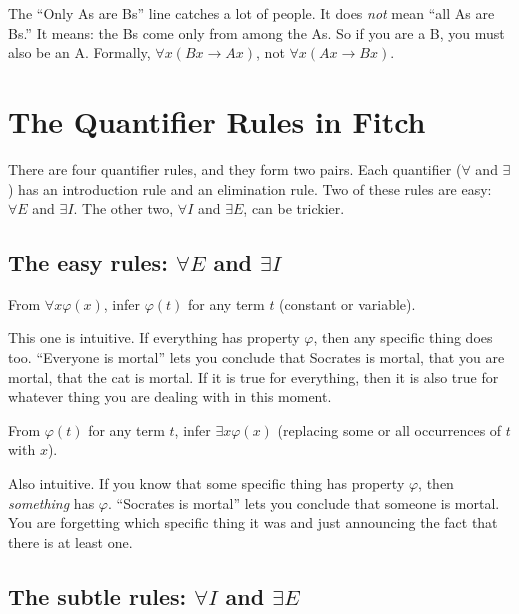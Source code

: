 \documentclass[11pt]{article}
\begin{document}
The ``Only As are Bs'' line catches a lot of people. It does \emph{not} mean ``all As are Bs.'' It means: the Bs come only from among the As. So if you are a B, you must also be an A. Formally, $\forall x(Bx \to Ax)$, not $\forall x(Ax \to Bx)$.

\section{The Quantifier Rules in Fitch}

There are four quantifier rules, and they form two pairs. Each quantifier ($\forall$ and $\exists$) has an introduction rule and an elimination rule. Two of these rules are easy: $\forall E$ and $\exists I$. The other two, $\forall I$ and $\exists E$, can be trickier.

\subsection{The easy rules: $\forall E$ and $\exists I$}

\begin{template}
From $\forall x \varphi(x)$, infer $\varphi(t)$ for any term $t$ (constant or variable).
\end{template}

This one is intuitive. If everything has property $\varphi$, then any specific thing does too. ``Everyone is mortal'' lets you conclude that Socrates is mortal, that you are mortal, that the cat is mortal. If it is true for everything, then it is also true for whatever thing you are dealing with in this moment.

\begin{template}
From $\varphi(t)$ for any term $t$, infer $\exists x \varphi(x)$ (replacing some or all occurrences of $t$ with $x$).
\end{template}

Also intuitive. If you know that some specific thing has property $\varphi$, then \emph{something} has $\varphi$. ``Socrates is mortal'' lets you conclude that someone is mortal. You are forgetting which specific thing it was and just announcing the fact that there is at least one.

\subsection{The subtle rules: $\forall I$ and $\exists E$}
\end{document}

